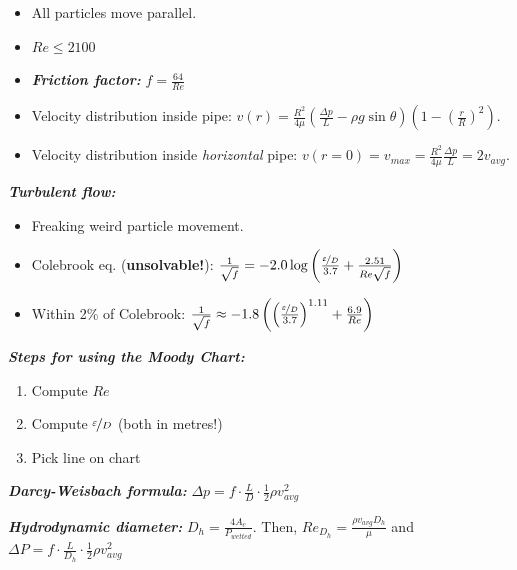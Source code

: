 \documentclass[10pt,landscape,letterpaper]{article}
\newcommand{\fsheetlabel}[1]{\textcolor{FSheetLabelColor}{\textbf{\textit{#1}}}}
\begin{document}
\begin{multicols*}{3}
\begin{minipage}{\columnwidth}
        \begin{itemize}
            \item All particles move parallel.
            \item $ Re \leq 2100 $
            \item \fsheetlabel{Friction factor:} $f = \frac{64}{Re}$
            \item Velocity distribution inside pipe: $ v(r) = \frac{R^2}{4\mu} \left( \frac{\Delta p}{L} - \rho g \sin{\theta} \right) \left( 1 - \left( \frac{r}{R} \right)^2 \right)$.
            \item Velocity distribution inside \textit{horizontal} pipe: $ v(r=0) = v_{max} = \frac{R^2}{4\mu} \frac{\Delta p}{L} = 2v_{avg} $.
        \end{itemize}
    
        \fsheetlabel{Turbulent flow:}
        
        \begin{itemize}
            \item Freaking weird particle movement.
            \item Colebrook eq. (\textbf{unsolvable!}): $ \frac{1}{\sqrt{f}} = -2.0 \log{\left( \frac{\nicefrac{\varepsilon}{D}}{3.7} + \frac{2.51}{Re \sqrt{f}} \right)} $
            \item Within 2\% of Colebrook: $ \frac{1}{\sqrt{f}} \approx -1.8 \left( \left( \frac{\nicefrac{\varepsilon}{D}}{3.7} \right)^{1.11} + \frac{6.9}{Re} \right) $
        \end{itemize}
    
        \fsheetlabel{Steps for using the Moody Chart:}
        
        \begin{enumerate}
            \item Compute $Re$
            \item Compute $ \nicefrac{\varepsilon}{D} $ (both in metres!)
            \item Pick line on chart
        \end{enumerate}
    
        \fsheetlabel{Darcy-Weisbach formula:} $ \Delta p = f \cdot \frac{L}{D} \cdot \frac{1}{2} \rho v_{avg}^2 $
        
        \fsheetlabel{Hydrodynamic diameter:} $ D_h = \frac{4A_c}{P_{wetted}} $. Then, $ Re_{D_h} = \frac{\rho v_{avg} D_h}{\mu} $ and $ \Delta P = f \cdot \frac{L}{D_h} \cdot \frac{1}{2} \rho v_{avg}^2 $
    \end{minipage}
    \vspace{2ex plus .5ex minus .5ex}
    

\end{multicols*}
\end{document}

